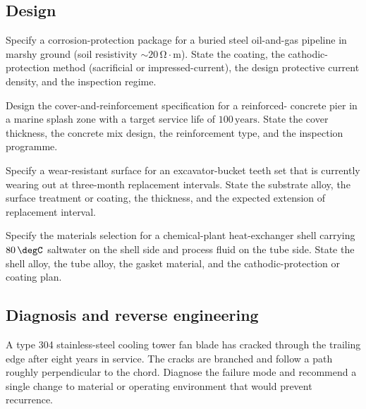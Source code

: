 \subsection*{Design}

\begin{exercise}
Specify a corrosion-protection package for a buried steel oil-and-gas
pipeline in marshy ground (soil resistivity $\sim 20\,\si{\ohm}\cdot
\text{m}$). State the coating, the cathodic-protection method
(sacrificial or impressed-current), the design protective current
density, and the inspection regime.
\end{exercise}

\begin{exercise}
Design the cover-and-reinforcement specification for a reinforced-
concrete pier in a marine splash zone with a target service life of
$100\,\text{years}$. State the cover thickness, the concrete mix design,
the reinforcement type, and the inspection programme.
\end{exercise}

\begin{exercise}
Specify a wear-resistant surface for an excavator-bucket teeth set
that is currently wearing out at three-month replacement intervals.
State the substrate alloy, the surface treatment or coating, the
thickness, and the expected extension of replacement interval.
\end{exercise}

\begin{exercise}
Specify the materials selection for a chemical-plant heat-exchanger
shell carrying $80\,\degC$ saltwater on the shell side and process
fluid on the tube side. State the shell alloy, the tube alloy, the
gasket material, and the cathodic-protection or coating plan.
\end{exercise}

\subsection*{Diagnosis and reverse engineering}

\begin{exercise}
A type 304 stainless-steel cooling tower fan blade has cracked
through the trailing edge after eight years in service. The cracks
are branched and follow a path roughly perpendicular to the chord.
Diagnose the failure mode and recommend a single change to material
or operating environment that would prevent recurrence.
\end{exercise}

